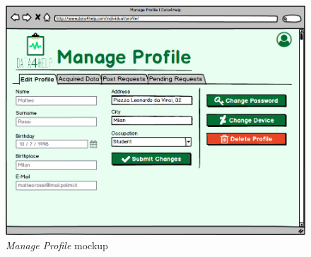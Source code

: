 \begin{figure}
\begin{center}
  \includegraphics[width=\textwidth]{img/mockup/Manage_Profile.png}
  \hspace{0.05\linewidth}
  \centering
  \caption{\textit{Manage Profile} mockup}
  \label{img:manageProfileMockup}
\end{center}
\end{figure}
